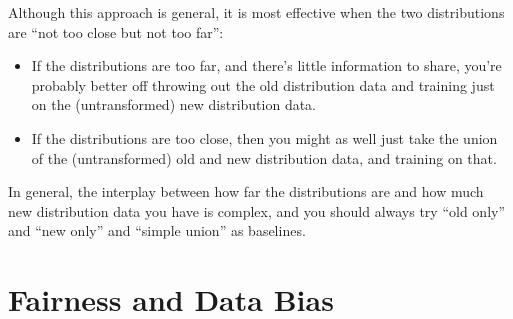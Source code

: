 Although this approach is general, it is most effective when the two distributions are ``not too close but not too far'':
\begin{itemize}
\item If the distributions are too far, and there's little information to share, you're probably better off throwing out the old distribution data and training just on the (untransformed) new distribution data.
\item If the distributions are too close, then you might as well just take the union of the (untransformed) old and new distribution data, and training on that.
\end{itemize}
In general, the interplay between how far the distributions are and how much new distribution data you have is complex, and you should always try ``old only'' and ``new only'' and ``simple union'' as baselines.

\section{Fairness and Data Bias}

